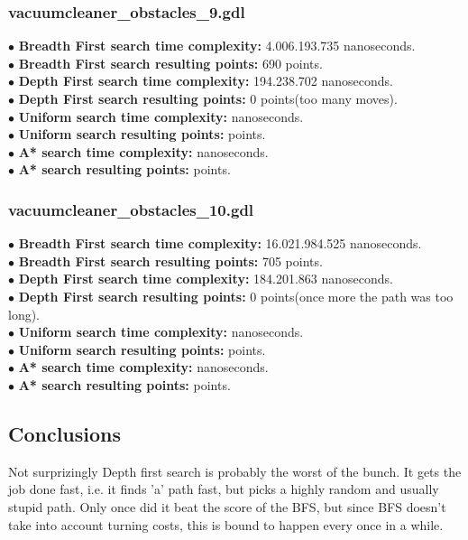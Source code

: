 \documentclass[11pt]{article}
\begin{document}
\subsubsection{vacuumcleaner\_obstacles\_9.gdl}
$\bullet$ {\bf Breadth First search time complexity: } 4.006.193.735 nanoseconds. \\
$\bullet$ {\bf Breadth First search resulting points: } 690 points. \\
$\bullet$ {\bf Depth First search time complexity: } 194.238.702 nanoseconds.\\
$\bullet$ {\bf Depth First search resulting points: } 0 points(too many moves).\\
$\bullet$ {\bf Uniform search time complexity: } nanoseconds. \\
$\bullet$ {\bf Uniform search resulting points: } points. \\
$\bullet$ {\bf A* search time complexity: } nanoseconds. \\ 
$\bullet$ {\bf A* search resulting points: } points.\\

\subsubsection{vacuumcleaner\_obstacles\_10.gdl}
$\bullet$ {\bf Breadth First search time complexity: } 16.021.984.525 nanoseconds. \\
$\bullet$ {\bf Breadth First search resulting points: } 705 points. \\
$\bullet$ {\bf Depth First search time complexity: } 184.201.863 nanoseconds.\\
$\bullet$ {\bf Depth First search resulting points: } 0 points(once more the path was too long). \\
$\bullet$ {\bf Uniform search time complexity: } nanoseconds. \\
$\bullet$ {\bf Uniform search resulting points: } points. \\
$\bullet$ {\bf A* search time complexity: } nanoseconds. \\ 
$\bullet$ {\bf A* search resulting points: } points.\\

\subsection{Conclusions}
Not surprizingly Depth first search is probably the worst of the bunch. It gets the job done fast, i.e. it finds 'a' path fast, but 
picks a highly random and usually stupid path. Only once did it beat the score of 
the BFS, but since BFS doesn't take into account turning costs, this is bound to happen every once in a while.\\
\end{document}

